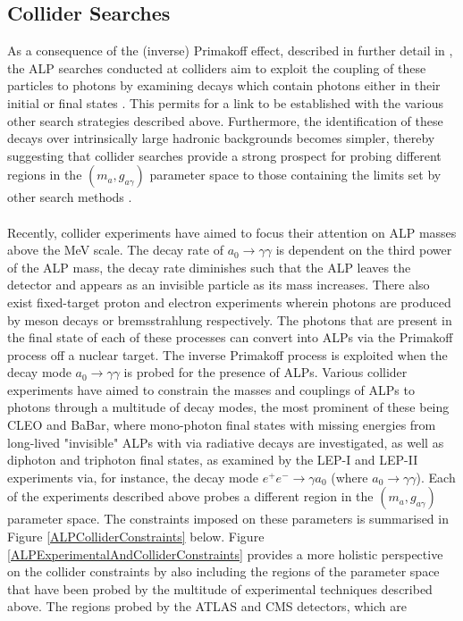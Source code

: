 \subsection{Collider Searches}   
As a consequence of the (inverse) Primakoff effect, described in further detail in \cite{Primakoff:1951iae}, the ALP searches conducted at colliders aim to exploit the coupling of these particles to photons by examining decays which contain photons either
in their initial or final states \cite{d'Enterria:2753504}. This permits for a link to be established with the various other search strategies described above. Furthermore, the identification of these decays over intrinsically large hadronic backgrounds becomes
simpler, thereby suggesting that collider searches provide a strong prospect for probing different regions in the $(m_{a}, g_{a\gamma})$ parameter space to those containing the limits set by other search methods \cite{d'Enterria:2753504}.\\
\\
Recently, collider experiments have aimed to focus their attention on ALP masses above the MeV scale. The decay rate of $a_{0}\rightarrow\gamma\gamma$ is dependent on the third power of the ALP mass, the decay rate 
diminishes such that the ALP leaves the detector and appears as an invisible particle as its mass increases. There also exist fixed-target proton and electron experiments wherein photons are produced by meson decays or bremsstrahlung
respectively. The photons that are present in the final state of each of these processes can convert into ALPs via the Primakoff process off a nuclear target. The inverse Primakoff process is exploited when the decay mode $a_{0}\rightarrow\gamma\gamma$ is probed for the presence of ALPs. Various collider experiments have
aimed to constrain the masses and couplings of ALPs to photons through a multitude of decay modes, the most prominent of these being CLEO and BaBar, where mono-photon final states with missing energies from long-lived "invisible" ALPs with via radiative decays are investigated, as well as diphoton and triphoton final states, as 
examined by the LEP-I and LEP-II experiments via, for instance, the decay mode $e^{+}e^{-}\rightarrow\gamma a_{0}$ (where $a_{0}\rightarrow\gamma\gamma$). Each of the experiments described above probes a different region in the $(m_a, g_{a\gamma})$ parameter space. The constraints imposed on these parameters is summarised in Figure
\ref{ALPColliderConstraints} below. Figure \ref{ALPExperimentalAndColliderConstraints} provides a more holistic perspective on the collider constraints by also including the regions of the parameter space that have been probed by the multitude of experimental techniques described above. The regions probed by the ATLAS and CMS detectors, which are
